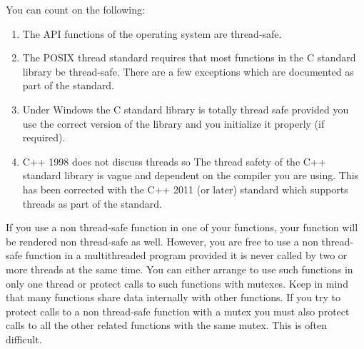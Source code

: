 You can count on the following:

\begin{enumerate}

\item The API functions of the operating system are thread-safe.

\item The POSIX thread standard requires that most functions in the C standard library be
  thread-safe. There are a few exceptions which are documented as part of the standard.

\item Under Windows the C standard library is totally thread safe provided you use the correct
  version of the library and you initialize it properly (if required).

\item C++ 1998 does not discuss threads so The thread safety of the C++ standard library is
  vague and dependent on the compiler you are using. This has been corrected with the C++ 2011
  (or later) standard which supports threads as part of the standard.

\end{enumerate}

If you use a non thread-safe function in one of your functions, your function will be rendered
non thread-safe as well. However, you are free to use a non thread-safe function in a
multithreaded program provided it is never called by two or more threads at the same time. You
can either arrange to use such functions in only one thread or protect calls to such functions
with mutexes. Keep in mind that many functions share data internally with other functions. If
you try to protect calls to a non thread-safe function with a mutex you must also protect calls
to all the other related functions with the same mutex. This is often difficult.
